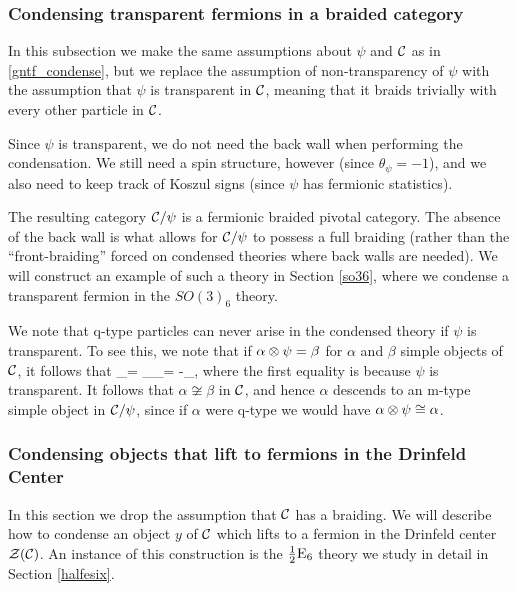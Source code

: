\subsubsection{Condensing transparent fermions in a braided category}
\label{condense_transparent_fermion}

In this subsection we make the same assumptions about $\psi$ and $\mathcal{C}$ as in \ref{gntf_condense}, 
but we replace the assumption of non-transparency of $\psi$ with the 
assumption that $\psi$ is transparent in $\mathcal{C}$, meaning that it braids trivially with every other particle in $\mathcal{C}$.

Since $\psi$ is transparent, we do not need the back wall when performing the condensation.
We still need a spin structure, however (since $\theta_\psi = -1$), and we also need to keep track of 
Koszul signs (since $\psi$ has fermionic statistics).

The resulting category $\mathcal{C}/\psi$ is a fermionic braided pivotal category.
The absence of the back wall is what allows for $\mathcal{C} / \psi$ to possess a full braiding (rather than the 
``front-braiding'' forced on condensed theories where back walls are needed). 
We will construct an example of such a theory in Section \ref{so36}, where we condense a transparent fermion 
in the $SO(3)_6$ theory.

We note that q-type particles can never arise in the condensed theory if $\psi$ is transparent.
To see this, we note that if $\alpha\otimes\psi = \beta$ for $\alpha$ and $\beta$ simple objects of $\mathcal{C}$, it follows that 
\be\theta_\beta = \theta_\alpha \theta_\psi = -\theta_\alpha,
\label{noq-type}\ee
where the first equality is because $\psi$ is transparent.
It follows that $\alpha \not\cong \beta$ in $\mathcal{C}$, and hence $\alpha$ descends to an m-type 
simple object in $\mathcal{C}/\psi$, since if $\alpha$ were q-type we would have $\alpha \otimes \psi \cong \alpha$.



\subsubsection{Condensing objects that lift to fermions in the Drinfeld Center}
\label{lift_and_condense}

In this section we drop the assumption that $\mathcal{C}$ has a braiding.
We will describe how to condense an object $y$ of $\mathcal{C}$ which lifts to a fermion in the Drinfeld center $\mathcal{Z}(\mathcal{C})$. 
An instance of this construction is the $\frac{1}{2}\text{E}_6$ theory we study in detail in Section \ref{halfesix}.

